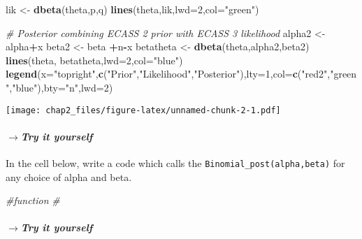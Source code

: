 \documentclass[
]{article}
\newenvironment{Shaded}{\begin{snugshade}}{\end{snugshade}}
\newcommand{\CommentTok}[1]{\textcolor[rgb]{0.56,0.35,0.01}{\textit{#1}}}
\newcommand{\DataTypeTok}[1]{\textcolor[rgb]{0.13,0.29,0.53}{#1}}
\newcommand{\DecValTok}[1]{\textcolor[rgb]{0.00,0.00,0.81}{#1}}
\newcommand{\KeywordTok}[1]{\textcolor[rgb]{0.13,0.29,0.53}{\textbf{#1}}}
\newcommand{\NormalTok}[1]{#1}
\newcommand{\OperatorTok}[1]{\textcolor[rgb]{0.81,0.36,0.00}{\textbf{#1}}}
\newcommand{\StringTok}[1]{\textcolor[rgb]{0.31,0.60,0.02}{#1}}
\begin{document}
\begin{Shaded}
\begin{Highlighting}[]
\NormalTok{lik <-}\StringTok{ }\KeywordTok{dbeta}\NormalTok{(theta,p,q)}
\KeywordTok{lines}\NormalTok{(theta,lik,}\DataTypeTok{lwd=}\DecValTok{2}\NormalTok{,}\DataTypeTok{col=}\StringTok{"green"}\NormalTok{)}

\CommentTok{# Posterior combining ECASS 2 prior with ECASS 3 likelihood}
\NormalTok{alpha2 <-}\StringTok{ }\NormalTok{alpha}\OperatorTok{+}\NormalTok{x}
\NormalTok{beta2 <-}\StringTok{ }\NormalTok{beta }\OperatorTok{+}\NormalTok{n}\OperatorTok{-}\NormalTok{x}
\NormalTok{betatheta <-}\StringTok{ }\KeywordTok{dbeta}\NormalTok{(theta,alpha2,beta2)}
\KeywordTok{lines}\NormalTok{(theta, betatheta,}\DataTypeTok{lwd=}\DecValTok{2}\NormalTok{,}\DataTypeTok{col=}\StringTok{"blue"}\NormalTok{)}
\KeywordTok{legend}\NormalTok{(}\DataTypeTok{x=}\StringTok{"topright"}\NormalTok{,}\KeywordTok{c}\NormalTok{(}\StringTok{"Prior"}\NormalTok{,}\StringTok{"Likelihood"}\NormalTok{,}\StringTok{"Posterior"}\NormalTok{),}\DataTypeTok{lty=}\DecValTok{1}\NormalTok{,}\DataTypeTok{col=}\KeywordTok{c}\NormalTok{(}\StringTok{"red2"}\NormalTok{,}\StringTok{"green"}\NormalTok{,}\StringTok{"blue"}\NormalTok{),}\DataTypeTok{bty=}\StringTok{"n"}\NormalTok{,}\DataTypeTok{lwd=}\DecValTok{2}\NormalTok{)}
\end{Highlighting}
\end{Shaded}

\texttt{[image: chap2\_files/figure-latex/unnamed-chunk-2-1.pdf]}

\hypertarget{rightarrowtry-it-yourself}{%
\paragraph{\texorpdfstring{\emph{\(\rightarrow\)Try it
yourself}}{\textbackslash rightarrowTry it yourself}}\label{rightarrowtry-it-yourself}}

In the cell below, write a code which calls the
\texttt{Binomial\_post(alpha,beta)} for any choice of alpha and beta.

\begin{Shaded}
\begin{Highlighting}[]
\CommentTok{#function}
\CommentTok{#}
\end{Highlighting}
\end{Shaded}

\hypertarget{rightarrowtry-it-yourself-1}{%
\paragraph{\texorpdfstring{\emph{\(\rightarrow\)Try it
yourself}}{\textbackslash rightarrowTry it yourself}}\label{rightarrowtry-it-yourself-1}}
\end{document}
